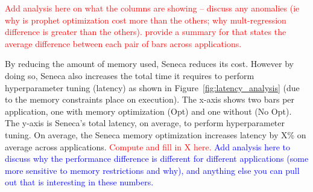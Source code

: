 {\textcolor{red}{Add analysis here on what the columns are showing -- discuss any anomalies (ie why is prophet optimization cost more than the others; why mult-regression difference is greater than the others). provide a summary for that states the average difference between each pair of bars across applications.}

By reducing the amount of memory used, Seneca reduces its cost.  However by doing so, Seneca also 
increases the total time it requires to perform hyperparameter tuning (latency) as shown 
in Figure~\ref{fig:latency_analysis} (due to the memory constraints place on execution).  The x-axis shows two bars per application, one with memory optimization (Opt) and one without (No Opt).  The y-axis is 
Seneca's total latency, on average, to perform hyperparameter tuning. 
On average, the Seneca memory optimization increases latency by X\% on average across applications.
\textcolor{red}{Compute and fill in X here.}
\textcolor{blue}{Add analysis here to discuss why the performance difference is different for different
applications (some more sensitive to memory restrictions and why), and anything else you can pull out that is interesting in these numbers.}


}
